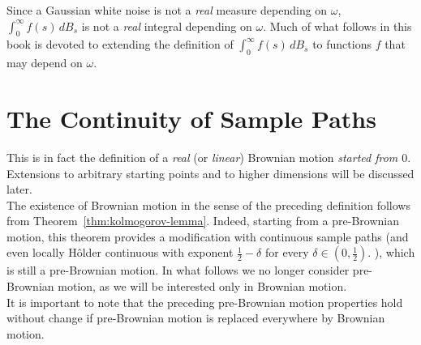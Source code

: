 \documentclass[../Main.tex]{subfiles}
\begin{document}
Since a Gaussian white noise is not a \emph{real} measure depending on $\omega$, $\int_0^\infty f(s)\,dB_s$ is not a \emph{real} integral depending on $\omega$. Much of what follows in this book is devoted to extending the definition of $\int_0^\infty f(s)\,dB_s$ to functions $f$ that may depend on $\omega$.
 
\section{The Continuity of Sample Paths}


This is in fact the definition of a \emph{real} (or \emph{linear}) Brownian motion \emph{started from $0$}. Extensions to arbitrary starting points and to higher dimensions will be discussed later. \\ 
The existence of Brownian motion in the sense of the preceding definition follows from Theorem~\ref{thm:kolmogorov-lemma}. Indeed, starting from a pre-Brownian motion, this theorem provides a modification with continuous sample paths (and even locally Hôlder continuous with exponent $\frac12-\delta$ for every $\delta\in(0,\tfrac12)$. ), which is still a pre-Brownian motion. In what follows we no longer consider pre-Brownian motion, as we will be interested only in Brownian motion. \\
It is important to note that the preceding pre-Brownian motion properties hold without change if pre-Brownian motion is replaced everywhere by Brownian motion. \\
\end{document}
